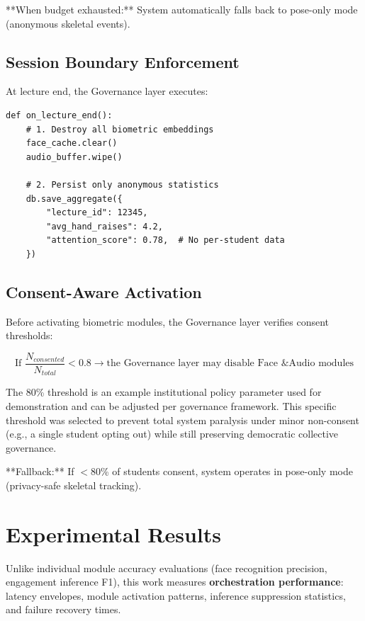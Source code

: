 \documentclass[conference]{IEEEtran}
\begin{document}
**When budget exhausted:** System automatically falls back to pose-only mode (anonymous skeletal events).

\subsection{Session Boundary Enforcement}
At lecture end, the Governance layer executes:

\begin{verbatim}
def on_lecture_end():
    # 1. Destroy all biometric embeddings
    face_cache.clear()
    audio_buffer.wipe()
      
    # 2. Persist only anonymous statistics
    db.save_aggregate({
        "lecture_id": 12345,
        "avg_hand_raises": 4.2,
        "attention_score": 0.78,  # No per-student data
    })
\end{verbatim}

\subsection{Consent-Aware Activation}
Before activating biometric modules, the Governance layer verifies consent thresholds:

\begin{equation}
\text{If } \frac{N_{consented}}{N_{total}} < 0.8 \to \text{the Governance layer may disable Face \& Audio modules}
\end{equation}

The 80\% threshold is an example institutional policy parameter used for demonstration and can be adjusted per governance framework. This specific threshold was selected to prevent total system paralysis under minor non-consent (e.g., a single student opting out) while still preserving democratic collective governance.

**Fallback:** If $<$80\% of students consent, system operates in pose-only mode (privacy-safe skeletal tracking).

\section{Experimental Results}

Unlike individual module accuracy evaluations (face recognition precision, engagement inference F1), this work measures \textbf{orchestration performance}: latency envelopes, module activation patterns, inference suppression statistics, and failure recovery times.
\end{document}

